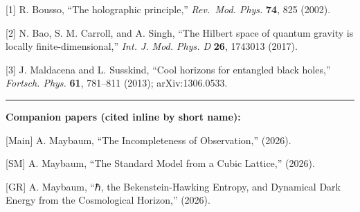 \documentclass[
]{article}
\begin{document}
{[}1{]} R. Bousso, ``The holographic principle,'' \emph{Rev.~Mod. Phys.}
\textbf{74}, 825 (2002).

{[}2{]} N. Bao, S. M. Carroll, and A. Singh, ``The Hilbert space of
quantum gravity is locally finite-dimensional,'' \emph{Int. J. Mod.
Phys. D} \textbf{26}, 1743013 (2017).

{[}3{]} J. Maldacena and L. Susskind, ``Cool horizons for entangled
black holes,'' \emph{Fortsch. Phys.} \textbf{61}, 781--811 (2013);
arXiv:1306.0533.

\begin{center}\rule{0.5\linewidth}{0.5pt}\end{center}

\textbf{Companion papers (cited inline by short name):}

{[}Main{]} A. Maybaum, ``The Incompleteness of Observation,'' (2026).

{[}SM{]} A. Maybaum, ``The Standard Model from a Cubic Lattice,''
(2026).

{[}GR{]} A. Maybaum, ``ℏ, the Bekenstein-Hawking Entropy, and Dynamical
Dark Energy from the Cosmological Horizon,'' (2026).
\end{document}
